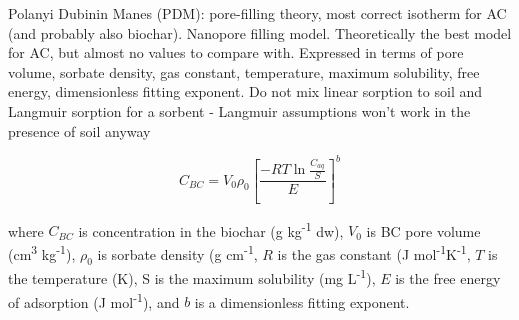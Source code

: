 Polanyi Dubinin Manes (PDM): pore-filling theory, most correct isotherm for AC (and probably also biochar). Nanopore filling model. Theoretically the best model for AC, but almost no values to compare with. Expressed in terms of pore volume, sorbate density, gas constant, temperature, maximum solubility, free energy, dimensionless fitting exponent. 
Do not mix linear sorption to soil and Langmuir sorption for a sorbent - Langmuir assumptions won't work in the presence of soil anyway

\begin{equation} \label{eq:PDM}
    C_{BC} = V_0\rho_0 \left [ \frac{-RT\ln \frac{C_{aq}}{S}}{E}\right ]^b
\end{equation}


where $C_{BC}$ is concentration in the biochar (g kg\textsuperscript{-1} dw), $V_0$ is BC pore volume (cm\textsuperscript{3} kg\textsuperscript{-1}), $\rho_0$ is sorbate density (g cm\textsuperscript{-1}, $R$ is the gas constant (J mol\textsuperscript{-1}K\textsuperscript{-1}, $T$ is the temperature (K), S is the maximum solubility (mg L\textsuperscript{-1}), $E$ is the free energy of adsorption (J mol\textsuperscript{-1}), and $b$ is a dimensionless fitting exponent. 